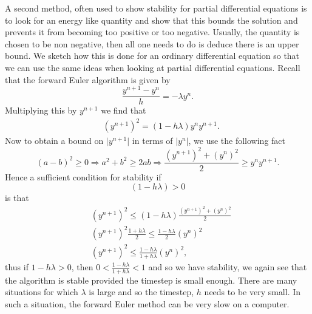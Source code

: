 A second method, often used to show stability for partial differential equations is to look for an energy like quantity and show that this bounds the solution and prevents it from becoming too positive or too negative. Usually, the quantity is chosen to be non negative, then all one needs to do is deduce there is an upper bound. We sketch how this is done for an ordinary differential equation so that we can use the same ideas when looking at partial differential equations. Recall that the forward Euler algorithm is given by
$$\frac{y^{n+1}-y^n}{h}=-\lambda y^n.$$
Multiplying this by $y^{n+1}$ we find that
\begin{align*}
&{} (y^{n+1})^2=(1-h\lambda)y^ny^{n+1}.
\end{align*}
Now to obtain a bound on $\lvert y^{n+1}\rvert$ in terms of $\lvert y^n \rvert$, we use the following fact
$$(a-b)^2\geq0\Rightarrow a^2+b^2\geq2ab\Rightarrow\frac{(y^{n+1})^2+(y^n)^2}{2}\geq y^ny^{n+1}.$$
Hence a sufficient condition for stability if 
$$(1-h\lambda)>0$$
is that
\begin{align*}
&{} (y^{n+1})^2\leq(1-h\lambda)\frac{(y^{n+1})^2+(y^n)^2}{2}
\\&{} (y^{n+1})^2\frac{1+h\lambda}{2}\leq\frac{1-h\lambda}{2}(y^n)^2
\\&{} (y^{n+1})^2\leq\frac{1-h\lambda}{1+h\lambda}(y^n)^2,
\end{align*}
thus if $1-h\lambda>0$, then $0<\frac{1-h\lambda}{1+h\lambda}<1$ and so we have stability, we again see that the algorithm is stable provided the timestep is small enough. There are many situations for which $\lambda$ is large and so the timestep, $h$ needs to be very small. In such a situation, the forward Euler method can be very slow on a computer.


